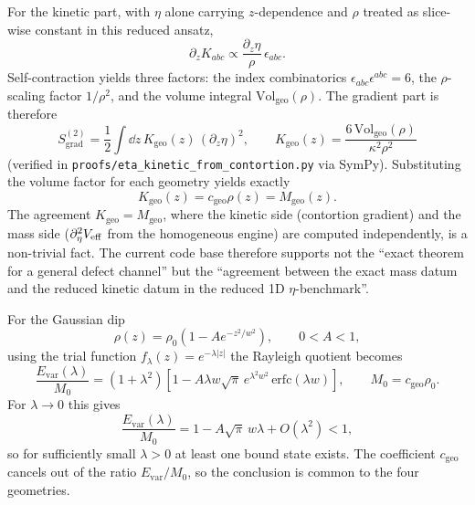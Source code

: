 For the kinetic part, with $\eta$ alone carrying $z$-dependence and $\rho$
treated as slice-wise constant in this reduced ansatz,
\begin{equation}
  \partial_z K_{abc}\propto\frac{\partial_z\eta}{\rho}\,\epsilon_{abc}.
\end{equation}
Self-contraction yields three factors: the index combinatorics
$\epsilon_{abc}\epsilon^{abc} = 6$, the $\rho$-scaling factor $1/\rho^2$, and
the volume integral $\mathrm{Vol}_{\mathrm{geo}}(\rho)$.  The gradient part
is therefore
\begin{equation}
  S^{(2)}_{\mathrm{grad}}
  = \frac{1}{2}\int \dd z\,K_{\mathrm{geo}}(z)\,(\partial_z\eta)^2,
  \qquad
  K_{\mathrm{geo}}(z) = \frac{6\,\mathrm{Vol}_{\mathrm{geo}}(\rho)}{\kappa^2 \rho^2}
\end{equation}
(verified in \texttt{proofs/eta\_kinetic\_from\_contortion.py} via SymPy).
Substituting the volume factor for each geometry yields exactly
\begin{equation}
  K_{\mathrm{geo}}(z) = c_{\mathrm{geo}}\rho(z) = M_{\mathrm{geo}}(z).
\end{equation}
The agreement $K_{\mathrm{geo}} = M_{\mathrm{geo}}$, where the kinetic side
(contortion gradient) and the mass side
($\partial^2_\eta V_{\mathrm{eff}}$ from the homogeneous engine) are computed
independently, is a non-trivial fact.  The current code base therefore
supports not the ``exact theorem for a general defect channel'' but the
``agreement between the exact mass datum and the reduced kinetic datum in
the reduced 1D $\eta$-benchmark''.

For the Gaussian dip
\begin{equation}
  \rho(z) = \rho_0(1 - A e^{-z^2/w^2}), \qquad 0 < A < 1,
\end{equation}
using the trial function $f_\lambda(z) = e^{-\lambda |z|}$ the Rayleigh
quotient becomes
\begin{equation}
  \frac{E_{\mathrm{var}}(\lambda)}{M_0}
  = (1+\lambda^2)\!\left[1 - A\lambda w\sqrt{\pi}\,e^{\lambda^2 w^2}\,\mathrm{erfc}(\lambda w)\right],
  \qquad
  M_0 = c_{\mathrm{geo}}\rho_0.
\end{equation}
For $\lambda\to 0$ this gives
\begin{equation}
  \frac{E_{\mathrm{var}}(\lambda)}{M_0}
  = 1 - A\sqrt{\pi}\,w\lambda + O(\lambda^2) < 1,
\end{equation}
so for sufficiently small $\lambda > 0$ at least one bound state exists.
The coefficient $c_{\mathrm{geo}}$ cancels out of the ratio
$E_{\mathrm{var}}/M_0$, so the conclusion is common to the four geometries.

